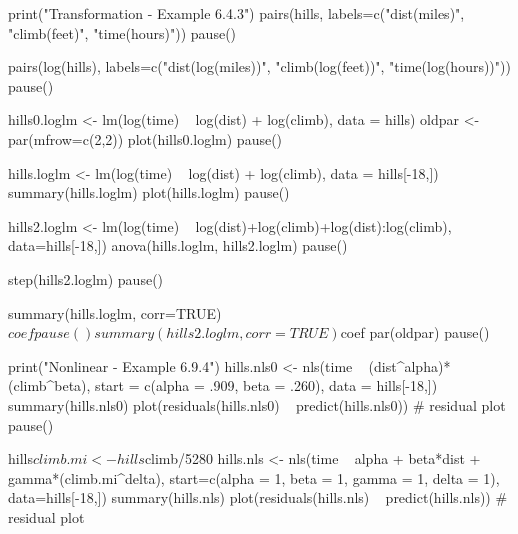 \begin{Examples}
\begin{ExampleCode}
print("Transformation - Example 6.4.3")
pairs(hills, labels=c("dist\n\n(miles)", "climb\n\n(feet)", 
"time\n\n(hours)"))
pause()

pairs(log(hills), labels=c("dist\n\n(log(miles))", "climb\n\n(log(feet))",
  "time\n\n(log(hours))"))
pause()

hills0.loglm <- lm(log(time) ~ log(dist) + log(climb), data = hills)  
oldpar <- par(mfrow=c(2,2))
plot(hills0.loglm)
pause()

hills.loglm <- lm(log(time) ~ log(dist) + log(climb), data = hills[-18,])
summary(hills.loglm) 
plot(hills.loglm)
pause()

hills2.loglm <- lm(log(time) ~ log(dist)+log(climb)+log(dist):log(climb), 
data=hills[-18,])
anova(hills.loglm, hills2.loglm)
pause()

step(hills2.loglm)
pause()

summary(hills.loglm, corr=TRUE)$coef
pause()

summary(hills2.loglm, corr=TRUE)$coef
par(oldpar)
pause()

print("Nonlinear - Example 6.9.4")
hills.nls0 <- nls(time ~ (dist^alpha)*(climb^beta), start =
   c(alpha = .909, beta = .260), data = hills[-18,])
summary(hills.nls0)
plot(residuals(hills.nls0) ~ predict(hills.nls0)) # residual plot
pause()

hills$climb.mi <- hills$climb/5280
hills.nls <- nls(time ~ alpha + beta*dist + gamma*(climb.mi^delta),
  start=c(alpha = 1, beta = 1, gamma = 1, delta = 1), data=hills[-18,])
summary(hills.nls)
plot(residuals(hills.nls) ~ predict(hills.nls)) # residual plot

\end{ExampleCode}
\end{Examples}

